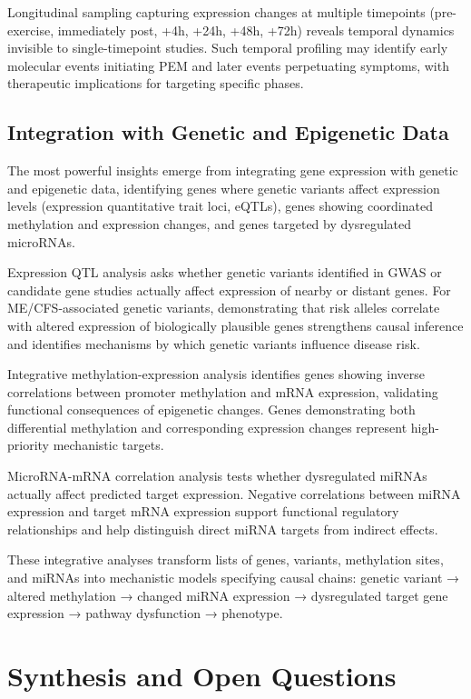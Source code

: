 Longitudinal sampling capturing expression changes at multiple timepoints (pre-exercise, immediately post, +4h, +24h, +48h, +72h) reveals temporal dynamics invisible to single-timepoint studies. Such temporal profiling may identify early molecular events initiating PEM and later events perpetuating symptoms, with therapeutic implications for targeting specific phases.

\subsection{Integration with Genetic and Epigenetic Data}

The most powerful insights emerge from integrating gene expression with genetic and epigenetic data, identifying genes where genetic variants affect expression levels (expression quantitative trait loci, eQTLs), genes showing coordinated methylation and expression changes, and genes targeted by dysregulated microRNAs.

Expression QTL analysis asks whether genetic variants identified in GWAS or candidate gene studies actually affect expression of nearby or distant genes. For ME/CFS-associated genetic variants, demonstrating that risk alleles correlate with altered expression of biologically plausible genes strengthens causal inference and identifies mechanisms by which genetic variants influence disease risk.

Integrative methylation-expression analysis identifies genes showing inverse correlations between promoter methylation and mRNA expression, validating functional consequences of epigenetic changes. Genes demonstrating both differential methylation and corresponding expression changes represent high-priority mechanistic targets.

MicroRNA-mRNA correlation analysis tests whether dysregulated miRNAs actually affect predicted target expression. Negative correlations between miRNA expression and target mRNA expression support functional regulatory relationships and help distinguish direct miRNA targets from indirect effects.

These integrative analyses transform lists of genes, variants, methylation sites, and miRNAs into mechanistic models specifying causal chains: genetic variant → altered methylation → changed miRNA expression → dysregulated target gene expression → pathway dysfunction → phenotype.

\section{Synthesis and Open Questions}
\label{sec:genetics-synthesis}

